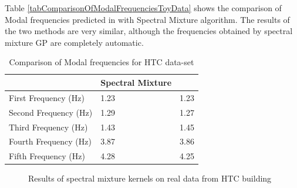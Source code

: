 Table \ref{tabComparisonOfModalFrequenciesToyData} shows the comparison of Modal frequencies predicted in \cite{brincker2000modal} with Spectral Mixture algorithm. The results of the two methods are very similar, although the frequencies obtained by spectral mixture GP are completely automatic. 

\renewcommand{\arraystretch}{1}
\begin{table}[!h]
    \centering
\begin{tabular}{|l|l|l|}
  \hline
    & Spectral Mixture & \cite{brincker2000modal} \\
  \hline 
  \hline
First Frequency (Hz) & 1.23 & 1.23\\
Second Frequency (Hz)  & 1.29 & 1.27\\
Third Frequency (Hz) & 1.43 & 1.45\\
Fourth Frequency (Hz) & 3.87 & 3.86\\
Fifth Frequency (Hz) & 4.28 & 4.25\\
   \hline
\end{tabular}
\caption{Comparison of Modal frequencies for HTC data-set}
  \label{tabComparisonOfModalFrequenciesHTCData}
\end{table}

\begin{figure}[!ht]
  \centering
  \quad
    \quad
  
  \caption{Results of spectral mixture kernels on real data from HTC building}
\end{figure}

